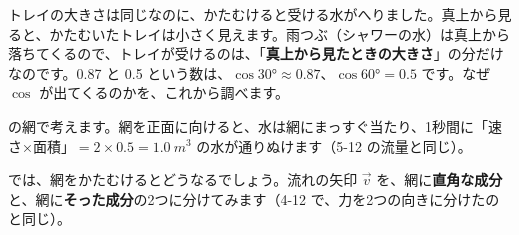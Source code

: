 トレイの大きさは同じなのに、かたむけると受ける水がへりました。真上から見ると、かたむいたトレイは小さく見えます。雨つぶ（シャワーの水）は真上から落ちてくるので、トレイが受けるのは、「\textbf{真上から見たときの大きさ}」の分だけなのです。0.87 と 0.5 という数は、$\cos\ang{30}\approx0.87$、$\cos\ang{60}=0.5$ です。なぜ $\cos$ が出てくるのかを、これから調べます。

\begin{omoidasou}
\end{omoidasou}




\label{bk:8-8:chokkaku}\bkhatenaref の網で考えます。網を正面に向けると、水は網にまっすぐ当たり、1秒間に「速さ×面積」$=2\times0.5=\qty{1.0}{m^3}$ の水が通りぬけます（5-12 の流量と同じ）。

では、網をかたむけるとどうなるでしょう。流れの矢印 $\vec v$ を、網に\textbf{直角な成分}と、網に\textbf{そった成分}の2つに分けてみます（4-12 で、力を2つの向きに分けたのと同じ）。

